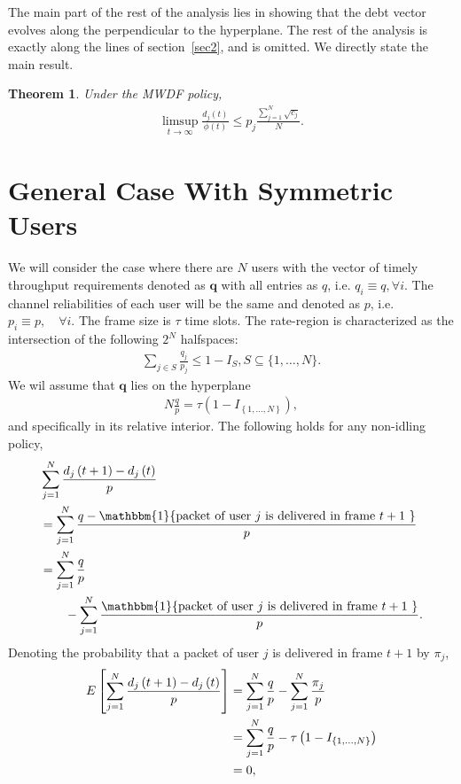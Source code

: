 \documentclass[letterpaper, 10 pt, conference]{ieeeconf}
\newtheorem{theorem}{Theorem}
\begin{document}
The main part of the rest of the analysis lies in showing that the debt vector evolves along the perpendicular to the hyperplane. The rest of the analysis is exactly along the lines of section~\ref{sec2}, and is omitted. We directly state the main result.
\begin{theorem}\label{theorem:main2}
Under the MWDF policy, 
\begin{align}
\limsup_{t\to\infty}\frac{d_{j}(t)}{\phi(t)} \leq p_{j} \frac{\sum_{j=1}^{N}\sqrt{c_{j}}}{N} .
\end{align}
\end{theorem}
\section{General Case With Symmetric Users}\label{sec6}
We will consider the case where there are $N$ users with the vector of timely throughput requirements denoted as $\bm{q}$ with all entries as $q$, i.e. $q_{i} \equiv q,\forall i$. The channel reliabilities of each user will be the same and denoted as $p$, i.e. $p_{i} \equiv p,\quad\forall i$. The frame size is $\tau$ time slots. The rate-region is characterized as the intersection of the following $2^{N}$ halfspaces:
\begin{align}\label{rateregion1}
\sum_{j\in S} \frac{q_{j}}{p_{j}} \leq 1-I_{S}, S\subseteq \{1,\ldots,N\}.
\end{align}
We wil assume that $\bm{q}$ lies on the hyperplane 
\begin{align}\label{hyper}
N\frac{q}{p} = \tau\left(1-I_{\left\{1,\ldots,N\right\}}\right),
\end{align}
and specifically in its relative interior.
The following holds for any non-idling policy,
\begin{align}\label{debtevol}
&\sum_{j=1}^{N} \frac{d_{j}\left(t+1\right) - d_{j}\left(t\right)}{p}\notag\\
&= \sum_{j=1}^{N}  \frac{q -\mathbbm{1}\{\mbox{packet of user $j$ is delivered in frame $t+1$ } \}  }{p}\notag\\
&= \sum_{j=1}^{N} \frac{q}{p} \notag\\
&\qquad-\sum_{j=1}^{N}\frac{\mathbbm{1}\{\mbox{packet of user $j$ is delivered in frame $t+1$ } \}  }{p}.\notag\\
\end{align}
Denoting the probability that a packet of user $j$ is delivered in frame $t+1$ by $\pi_{j}$,
\begin{align}\label{debtevol1}
E\left[\sum_{j=1}^{N} \frac{d_{j}\left(t+1\right) - d_{j}\left(t\right)}{p}\right] &= \sum_{j=1}^{N} \frac{q}{p} - \sum_{j=1}^{N} \frac{\pi_{j}}{p} \notag \\
&=  \sum_{j=1}^{N} \frac{q}{p} - \tau\left(1-I_{\left\{1,\ldots,N\right\}}\right)\notag \\
&=0,
\end{align}
\end{document}
